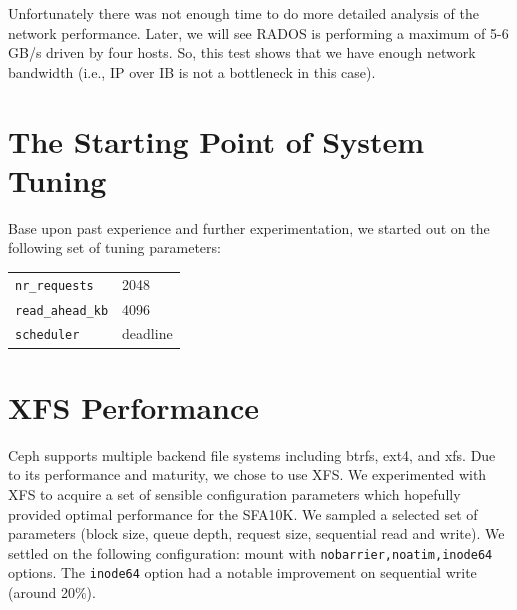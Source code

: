 \documentclass{article}
\begin{document}
Unfortunately there was not enough time to do more detailed analysis of the network
performance. Later, we will see RADOS is performing a
maximum of 5-6 GB/s driven by four hosts.  So, this test shows that we
have enough network bandwidth (i.e., IP over IB is not a bottleneck in this
case).




\section{The Starting Point of System Tuning}

Base upon past experience and further experimentation, we started out on the
following set of tuning parameters:

\begin{table}[htb]
\centering
\begin{tabular}{ll}
    \toprule
    \verb!nr_requests! & 2048 \\
    \verb!read_ahead_kb! & 4096 \\
    \verb!scheduler! & deadline \\
    \bottomrule
\end{tabular}

\end{table}



\section{XFS Performance}

Ceph supports multiple backend file systems including btrfs, ext4, and xfs.
Due to its performance and maturity, we chose to use XFS. We
experimented with XFS to acquire a set of sensible configuration parameters
which hopefully provided optimal performance for the SFA10K. We sampled a selected set of parameters (block size,
queue depth, request size, sequential read and write). We settled on the following
configuration: mount with \verb!nobarrier,noatim,inode64! options.
The \verb!inode64! option had a notable improvement on sequential write (around
20\%).
\end{document}
